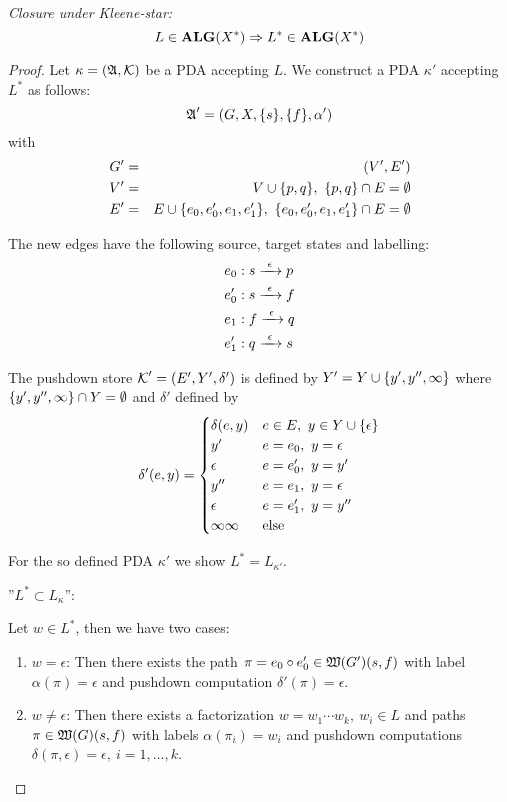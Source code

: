 {\em Closure under Kleene-star:}
\[ L \in \mbox{{\bf ALG}}(X^*) \Rightarrow L^* \in \mbox{{\bf ALG}}(X^*) \]
\begin{proof}
Let $\kappa = (\mbox{$\mathfrak{A}$}, \mbox{$\mathcal{K}$})$ be a PDA accepting $L$. We construct a PDA
$\kappa'$ accepting $L^*$ as follows:
\[ \mbox{$\mathfrak{A}$}' = (G, X, \mbox{$\{s\}$}, \mbox{$\{f\}$}, \alpha')\]
with
\begin{eqnarray*}
G' &=& (V', E') \\
V' &=& V \cup \mbox{$\{p, q\}$},\ \mbox{$\{p, q\}$} \cap E = \emptyset \\
E' &=& E \cup \mbox{$\{e_0, e_0', e_1, e_1'\}$},\ \mbox{$\{e_0, e_0', e_1, e_1'\}$} \cap E
= \emptyset \\
\end{eqnarray*}

The new edges have the following source, target states and labelling:
\begin{eqnarray*}
& e_0: s \xrightarrow{\ {\epsilon}\ } p \\
& e_0': s \xrightarrow{\ {\epsilon}\ } f \\
& e_1: f \xrightarrow{\ {\epsilon}\ } q \\
& e_1': q \xrightarrow{\ {\epsilon}\ } s \\
\end{eqnarray*}

\missingfigure

The pushdown store $\mbox{$\mathcal{K}$}' = (E', Y', \delta')$ is defined by $Y' = Y
\cup \mbox{$\{y', y'', \infty\}$}$ where $\mbox{$\{y', y'', \infty\}$} \cap Y =
\emptyset$ and $\delta'$ defined by
\[ \delta'(e, y) = \begin{cases}
\delta(e, y)		& e \in E,\ y \in  Y \cup \mbox{$\{\epsilon\}$} \\
y'							& e = e_0,\ y = \epsilon \\
\epsilon				& e = e_0',\ y = y' \\
y''							& e = e_1,\ y = \epsilon \\
\epsilon				& e = e_1',\ y = y'' \\
\infty\infty		& \text{else}
\end{cases}\]

For the so defined PDA $\kappa'$ we show $L^* = L_{\kappa'}$.

''$L^* \subset L_{\kappa}$'':

Let $w \in L^*$, then we have two cases:

\begin{enumerate}
  \item $w = \epsilon$: Then there exists the path $\pi = e_0 \circ e_0' \in
  \mbox{$\mathfrak{W}({G'})$}(s, f)$ with label $\alpha(\pi) = \epsilon$ and
  pushdown computation $\delta'(\pi) = \epsilon$.
  \item $w \neq \epsilon$: Then there exists a factorization $w = w_1 \cdots
  w_k,\ w_i \in L$ and paths $\pi \in \mbox{$\mathfrak{W}({G})$}(s, f)$ with labels
  $\alpha(\pi_i) = w_i$ and pushdown computations $\delta(\pi, \epsilon) =
  \epsilon,\ i = 1, \ldots, k$.
  

\end{enumerate}
\end{proof}

